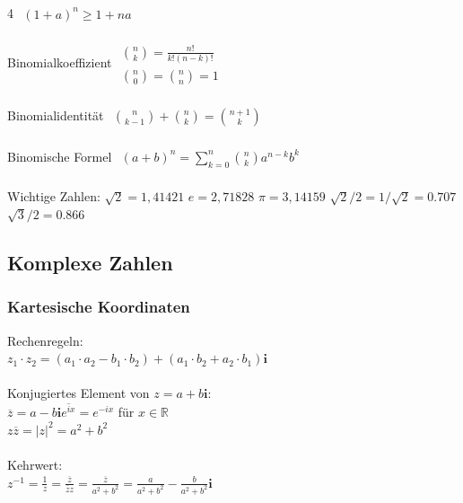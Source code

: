 \documentclass[6pt,a4paper]{scrartcl}
\begin{document}
\begin{multicols*}{4}
\begin{math}
\begin{array}{l}
            (1+a)^n \ge 1 + na
        \end{array}\end{math}\\
    \\
    Binomialkoeffizient \qquad \qquad \qquad
    \begin{math}\begin{array}{l}
            \binom{n}{k} = \frac{n!}{k!(n-k)!} \\
            \binom{n}{0} = \binom{n}{n} = 1
        \end{array}\end{math}\\
    \\
    Binomialidentität \qquad \qquad \qquad \quad
    \begin{math}\begin{array}{l}
            \binom{n}{k-1}+\binom{n}{k} = \binom{n+1}{k}
        \end{array}\end{math}\\
    \\
    Binomische Formel \qquad \qquad \qquad
    \begin{math}\begin{array}{l}
            (a+b)^n = \sum\limits_{k = 0}^{n} \binom{n}{k} a^{n-k} b^{k}
        \end{array}\end{math}   \\
    \\
    Wichtige Zahlen: $\sqrt{2} = 1,41421$ \quad $e = 2,71828$ \quad $\pi =  3,14159$ \quad $\sqrt{2}/2 = 1/\sqrt{2} = 0.707$ \quad $\sqrt{3}/2 = 0.866$\\


    \subsection{Komplexe Zahlen}
    \subsubsection{Kartesische Koordinaten}
    Rechenregeln:\\
    $z_1\cdot z_2=(a_1\cdot a_2-b_1\cdot b_2)+(a_1\cdot b_2+a_2\cdot b_1)\mathbf{i}$\\
    \\
    Konjugiertes Element von $z=a+b\mathbf{i}$:\\
    $\overline{z}=a-b\mathbf{i}$\qquad \qquad ${\overline{e^{ix}}} = e^{-ix}$ für $x \in \mathbb R$  \\
    $z\overline{z}=|z|^2=a^2+b^2$\\
    \\
    Kehrwert:\\
    $z^{-1}=\frac{1}{z}=\frac{\overline z}{\overline z z}=\frac{\overline z}{a^2+b^2}=\frac{a}{a^2+b^2} - \frac{b}{a^2+b^2}\mathbf{i}$



\end{multicols*}
\end{document}
